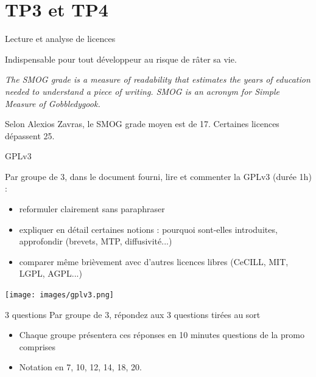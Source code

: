 \documentclass{beamer}
\begin{document}
\section{TP3 et TP4}

\begin{frame}{Lecture et analyse de licences}

Indispensable pour tout développeur au risque de râter sa vie.

\textit{The SMOG grade is a measure of readability that estimates the years of education needed to understand a piece of writing. SMOG is an acronym for Simple Measure of Gobbledygook.}

Selon Alexios Zavras, le SMOG grade moyen est de 17. Certaines licences dépassent 25.

\end{frame}


\begin{frame}{GPLv3}


  Par groupe de 3, dans le document fourni, lire et commenter la GPLv3 (durée 1h) :
  \begin{itemize}
    \item reformuler clairement sans paraphraser
    \item expliquer en détail certaines notions : pourquoi sont-elles introduites, approfondir (brevets, MTP, diffusivité...)
    \item comparer même brièvement avec d'autres licences libres (CeCILL, MIT, LGPL, AGPL...)
   \end{itemize}

  \begin{center}
    \texttt{[image: images/gplv3.png]}
\end{center}
\end{frame}

\begin{frame}{3 questions}
 Par groupe de 3, répondez aux 3 questions tirées au sort
 \begin{itemize}
 \item Chaque groupe présentera ces réponses en 10 minutes
   questions de la promo comprises
 \item Notation en 7, 10, 12, 14, 18, 20.
 \end{itemize}

\end{frame}

\end{document}

